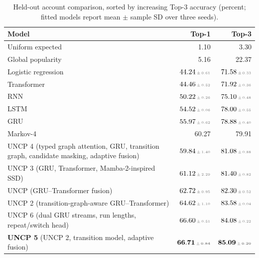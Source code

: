 \documentclass[sn-mathphys-num, Numbered]{sn-jnl}%
\theoremstyle{thmstyleone}%
\theoremstyle{thmstyletwo}%
\theoremstyle{thmstylethree}%
\providecommand{\DIFadd}[1]{{\protect\color{green!40!black}#1}} %
\providecommand{\DIFaddFL}[1]{\DIFadd{#1}} %
\begin{document}
\newcommand{\modeldetail}[1]{{\footnotesize\color{green!35!black}(#1)}}
\newcommand{\score}[2]{#1\,{\color{black!55}\scriptscriptstyle\pm\,#2}}
\newcommand{\uncpbase}{UNCP \modeldetail{GRU--Transformer fusion}}
\newcommand{\uncptwo}{UNCP 2 \modeldetail{transition-graph-aware GRU--Transformer}}
\newcommand{\uncpthree}{UNCP 3 \modeldetail{GRU, Transformer, Mamba-2-inspired SSD}}
\newcommand{\uncpfour}{UNCP 4 \modeldetail{typed graph attention, GRU, transition graph, candidate masking, adaptive fusion}}
\newcommand{\uncpfive}{\textbf{UNCP 5} \modeldetail{UNCP 2, transition model, adaptive fusion}}
\newcommand{\uncpsix}{UNCP 6 \modeldetail{dual GRU streams, run lengths, repeat/switch head}}

\begin{table}[!htbp]
\centering
\caption{\DIFaddFL{Held-out account comparison, sorted by increasing Top-3 accuracy (percent; fitted models report mean $\pm$ sample SD over three seeds).}}
\label{tab:compact-results}
\small
\begin{tabular}{@{}p{.53\linewidth}rr@{}}
\toprule
\DIFaddFL{Model }& \DIFaddFL{Top-1 }& \DIFaddFL{Top-3 }\\
\midrule
\DIFaddFL{Uniform expected }& \DIFaddFL{1.10 }& \DIFaddFL{3.30 }\\
\DIFaddFL{Global popularity }& \DIFaddFL{5.16 }& \DIFaddFL{22.37 }\\
\DIFaddFL{Logistic regression }& \DIFaddFL{$\score{44.24}{0.61}$ }& \DIFaddFL{$\score{71.58}{0.33}$ }\\
\DIFaddFL{Transformer }& \DIFaddFL{$\score{44.46}{0.52}$ }& \DIFaddFL{$\score{71.92}{0.36}$ }\\
\DIFaddFL{RNN }& \DIFaddFL{$\score{50.22}{0.26}$ }& \DIFaddFL{$\score{75.10}{0.48}$ }\\
\DIFaddFL{LSTM }& \DIFaddFL{$\score{54.52}{0.06}$ }& \DIFaddFL{$\score{78.00}{0.55}$ }\\
\DIFaddFL{GRU }& \DIFaddFL{$\score{55.97}{0.62}$ }& \DIFaddFL{$\score{78.88}{0.40}$ }\\
\DIFaddFL{Markov-4 }& \DIFaddFL{60.27 }& \DIFaddFL{79.91 }\\
\uncpfour & \DIFaddFL{$\score{59.84}{1.40}$ }& \DIFaddFL{$\score{81.08}{0.88}$ }\\
\uncpthree & \DIFaddFL{$\score{61.12}{2.29}$ }& \DIFaddFL{$\score{81.40}{0.82}$ }\\
\uncpbase & \DIFaddFL{$\score{62.72}{0.95}$ }& \DIFaddFL{$\score{82.30}{0.52}$ }\\
\uncptwo & \DIFaddFL{$\score{64.62}{1.10}$ }& \DIFaddFL{$\score{83.58}{0.04}$ }\\
\uncpsix & \DIFaddFL{$\score{66.60}{0.51}$ }& \DIFaddFL{$\score{84.08}{0.22}$ }\\
\uncpfive & \DIFaddFL{$\mathbf{\score{66.71}{0.84}}$ }& \DIFaddFL{$\mathbf{\score{85.09}{0.20}}$ }\\
\bottomrule
\end{tabular}
\end{table}
\end{document}
